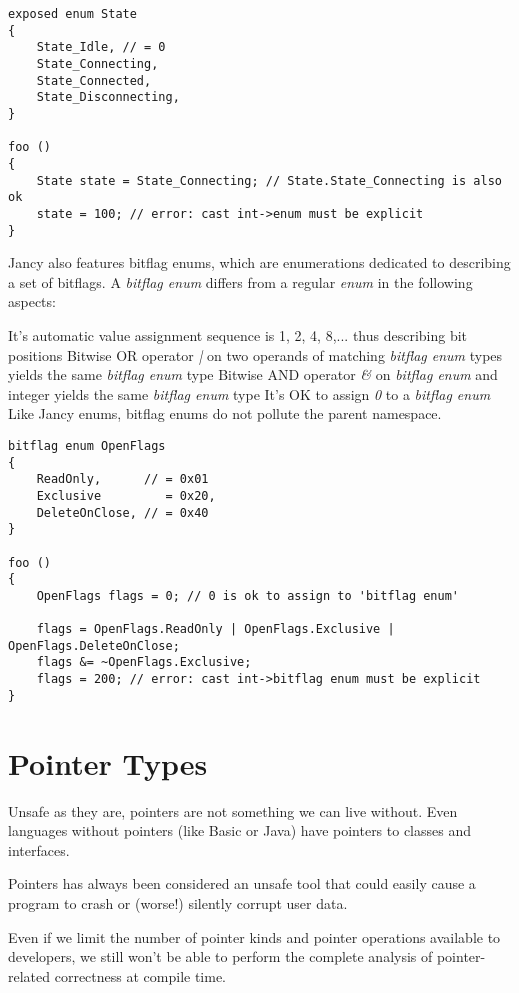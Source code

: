 \documentclass[oneside]{book}
\begin{document}
\begin{lstlisting}
exposed enum State
{
    State_Idle, // = 0
    State_Connecting,
    State_Connected,
    State_Disconnecting,
}

foo ()
{
    State state = State_Connecting; // State.State_Connecting is also ok
    state = 100; // error: cast int->enum must be explicit
}
\end{lstlisting}

Jancy also features bitflag enums, which are enumerations dedicated to describing a set of bitflags. A \emph{bitflag enum} differs from a regular \emph{enum} in the following aspects:

It's automatic value assignment sequence is 1, 2, 4, 8,... thus describing bit positions
Bitwise OR operator \emph{|} on two operands of matching \emph{bitflag enum} types yields the same \emph{bitflag enum} type
Bitwise AND operator \emph{\&} on \emph{bitflag enum} and integer yields the same \emph{bitflag enum} type
It's OK to assign \emph{0} to a \emph{bitflag enum}
Like Jancy enums, bitflag enums do not pollute the parent namespace.

\begin{lstlisting}
bitflag enum OpenFlags
{
    ReadOnly,      // = 0x01
    Exclusive         = 0x20,
    DeleteOnClose, // = 0x40
}

foo ()
{
    OpenFlags flags = 0; // 0 is ok to assign to 'bitflag enum'
     
    flags = OpenFlags.ReadOnly | OpenFlags.Exclusive | OpenFlags.DeleteOnClose;
    flags &= ~OpenFlags.Exclusive;
    flags = 200; // error: cast int->bitflag enum must be explicit
}
\end{lstlisting}

\section{Pointer Types}

Unsafe as they are, pointers are not something we can live without. Even languages without pointers (like Basic or Java) have pointers to classes and interfaces.

Pointers has always been considered an unsafe tool that could easily cause a program to crash or (worse!) silently corrupt user data.

Even if we limit the number of pointer kinds and pointer operations available to developers, we still won't be able to perform the complete analysis of pointer-related correctness at compile time.
\end{document}
